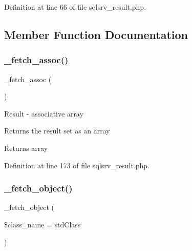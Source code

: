 Definition at line 66 of file sqlsrv\+\_\+result.\+php.



\subsection{Member Function Documentation}
\mbox{\label{class_c_i___d_b__sqlsrv__result_a43a9a92817f1334a1c10752ec44275a0}} 
\subsubsection{\texorpdfstring{\_fetch\_assoc()}{\_fetch\_assoc()}}
{\footnotesize\ttfamily \+\_\+fetch\+\_\+assoc (\begin{DoxyParamCaption}{ }\end{DoxyParamCaption})\hspace{0.3cm}{\ttfamily [protected]}}

Result -\/ associative array

Returns the result set as an array

\begin{DoxyReturn}{Returns}
array 
\end{DoxyReturn}


Definition at line 173 of file sqlsrv\+\_\+result.\+php.

\mbox{\label{class_c_i___d_b__sqlsrv__result_a60806be6a9c2488820813c2a7f4fef71}} 
\subsubsection{\texorpdfstring{\_fetch\_object()}{\_fetch\_object()}}
{\footnotesize\ttfamily \+\_\+fetch\+\_\+object (\begin{DoxyParamCaption}\item[{}]{\$class\+\_\+name = {\ttfamily \textquotesingle{}stdClass\textquotesingle{}} }\end{DoxyParamCaption})\hspace{0.3cm}{\ttfamily [protected]}}

